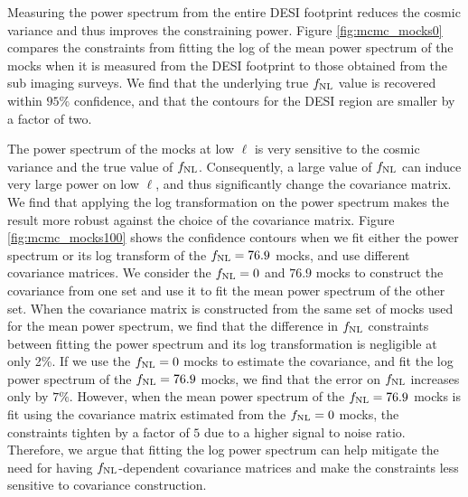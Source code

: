 Measuring the power spectrum from the entire DESI footprint reduces the cosmic variance and thus improves the constraining power. Figure \ref{fig:mcmc_mocks0} compares the constraints from fitting the log of the mean power spectrum of the mocks when it is measured from the DESI footprint to those obtained from the sub imaging surveys. We find that the underlying true $f_{\rm NL}$ value is recovered within $95\%$ confidence, and that the contours for the DESI region are smaller by a factor of two. 

The power spectrum of the mocks at low $\ell$ is very sensitive to the cosmic variance and the true value of $f_{\rm NL}$. Consequently, a large value of $f_{\rm NL}$ can induce very large power on low $\ell$, and thus significantly change the covariance matrix. We find that applying the log transformation on the power spectrum makes the result more robust against the choice of the covariance matrix. Figure \ref{fig:mcmc_mocks100} shows the confidence contours when we fit either the power spectrum or its log transform of the $f_{\rm NL}=76.9$ mocks, and use different covariance matrices. We consider the $f_{\rm NL}=0$ and $76.9$ mocks to construct the covariance from one set and use it to fit the mean power spectrum of the other set. When the covariance matrix is constructed from the same set of mocks used for the mean power spectrum, we find that the difference in $f_{\rm NL}$ constraints between fitting the power spectrum and its log transformation is negligible at only 2\%. If we use the $f_{\rm NL}=0$ mocks to estimate the covariance, and fit the log power spectrum of the $f_{\rm NL}=76.9$ mocks, we find that the error on $f_{\rm NL}$ increases only by $7\%$. However, when the mean power spectrum of the $f_{\rm NL}=76.9$ mocks is fit using the covariance matrix estimated from the $f_{\rm NL}=0$ mocks, the constraints tighten by a factor of $5$ due to a higher signal to noise ratio. Therefore, we argue that fitting the log power spectrum can help mitigate the need for having $f_{\rm NL}$-dependent covariance matrices and make the constraints less sensitive to covariance construction.

